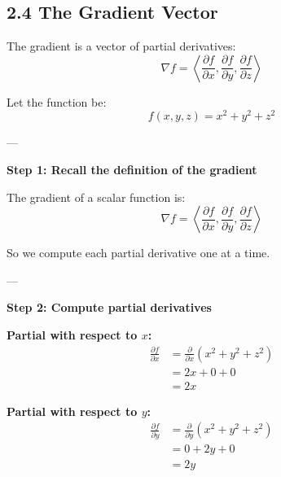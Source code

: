 \subsection*{2.4 The Gradient Vector}

\begin{conceptbox}
    The gradient is a vector of partial derivatives:
    \begin{equation*}
        \nabla f = \left\langle \frac{\partial f}{\partial x}, \frac{\partial f}{\partial y}, \frac{\partial f}{\partial z} \right\rangle
    \end{equation*}
\end{conceptbox}

\begin{examplebox}
    Let the function be:
    \begin{equation*}
        f(x,y,z) = x^2 + y^2 + z^2
    \end{equation*}

    ---

    \textbf{Step 1: Recall the definition of the gradient}

    The gradient of a scalar function is:
    \begin{equation*}
        \nabla f = \left\langle \frac{\partial f}{\partial x}, \frac{\partial f}{\partial y}, \frac{\partial f}{\partial z} \right\rangle
    \end{equation*}

    So we compute each partial derivative one at a time.

    ---

    \textbf{Step 2: Compute partial derivatives}

    \textbf{Partial with respect to $x$:}
    \begin{align*}
        \frac{\partial f}{\partial x}
         & = \frac{\partial}{\partial x}(x^2 + y^2 + z^2) \\
         & = 2x + 0 + 0                                   \\
         & = 2x
    \end{align*}

    \textbf{Partial with respect to $y$:}
    \begin{align*}
        \frac{\partial f}{\partial y}
         & = \frac{\partial}{\partial y}(x^2 + y^2 + z^2) \\
         & = 0 + 2y + 0                                   \\
         & = 2y
    \end{align*}


\end{examplebox}
